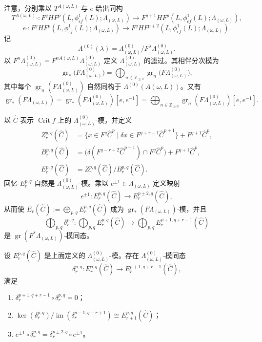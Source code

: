 注意，分别乘以 $T^{A(\omega,L)}$ 与 $e$ 给出同构
\[
 T^{A(\omega,L)}\cdot:F^qHF^p(L,\phi_{\epsilon f}^1(L);\Lambda_{(\omega,L)})
 \longrightarrow F^{q+1}HF^p(L,\phi_{\epsilon f}^1(L);\Lambda_{(\omega,L)}),
\]
\[
 e\cdot:F^qHF^p(L,\phi_{\epsilon f}^1(L);\Lambda_{(\omega,L)})
 \longrightarrow F^qHF^{p+2}(L,\phi_{\epsilon f}^1(L);\Lambda_{(\omega,L)}).
\]
记
\[
 \Lambda^{(0)}(\lambda)=\Lambda_{(\omega,L)}^{(0)}
 /F^\lambda\Lambda_{(\omega,L)}^{(0)}.
\]
以
$F^n\Lambda_{(\omega,L)}^{(0)}=F^{nA(\omega,L)}\Lambda_{(\omega,L)}^{(0)}$
定义 $\Lambda_{(\omega,L)}^{(0)}$ 的滤过。其相伴分次模为
\[
 \operatorname{gr}_*\bigl(F\Lambda_{(\omega,L)}^{(0)}\bigr)
 =\bigoplus_{n\in\mathbb Z_{\geq0}}
 \operatorname{gr}_n\bigl(F\Lambda_{(\omega,L)}^{(0)}\bigr),
\]
其中每个 $\operatorname{gr}_n(F\Lambda_{(\omega,L)}^{(0)})$ 自然同构于
$\Lambda^{(0)}(A(\omega,L))$。又有
\[
 \operatorname{gr}_*(F\Lambda_{(\omega,L)})
 =\operatorname{gr}_*(F\Lambda_{(\omega,L)}^{(0)})[e,e^{-1}]
 =\bigoplus_{n\in\mathbb Z_{\geq0}}
 \operatorname{gr}_n(F\Lambda_{(\omega,L)}^{(0)})[e,e^{-1}].
\]

以 $\widehat C$ 表示 $\operatorname{Crit}f$ 上的
$\Lambda_{(\omega,L)}^{(0)}$-模，并定义
\[
 \begin{aligned}
 Z_r^{p,q}(\widehat C)
 &=\{x\in F^q\widehat C^p\mid
 \delta x\in F^{q+r-1}\widehat C^{p+1}\}+F^{q+1}\widehat C^p,\\
 B_r^{p,q}(\widehat C)
 &=\bigl(\delta(F^{q-r+2}\widehat C^{p-1})\cap F^q\widehat C^p\bigr)
 +F^{q+1}\widehat C^p,\\
 E_r^{p,q}(\widehat C)&=Z_r^{p,q}(\widehat C)/B_r^{p,q}(\widehat C).
 \end{aligned}
\]
回忆 $E_r^{p,q}$ 自然是 $\Lambda_{(\omega,L)}^{(0)}$-模。乘以
$e^{\pm1}\in\Lambda_{(\omega,L)}$ 定义映射
\[
 e^{\pm1}:E_r^{p,q}(\widehat C)\to E_r^{p\pm2,q}(\widehat C),
\]
从而使
$E_r(\widehat C):=\bigoplus_{p,q}E_r^{p,q}(\widehat C)$ 成为
$\operatorname{gr}_*(F\Lambda_{(\omega,L)})$-模，并且
\[
 \bigoplus_{p,q}\delta_r^{p,q}:
 \bigoplus_{p,q}E_r^{p,q}(\widehat C)
 \longrightarrow
 \bigoplus_{p,q}E_r^{p+1,q+r-1}(\widehat C)
\]
是 $\operatorname{gr}(F^*\Lambda_{(\omega,L)})$-模同态。

\begin{lemma}
\label{lem:spectral-sequence-differential}
设 $E_r^{p,q}(\widehat C)$ 是上面定义的 $\Lambda_{(\omega,L)}^{(0)}$-模。存在
$\Lambda_{(\omega,L)}^{(0)}$-模同态
\[
 \delta_r^{p,q}:E_r^{p,q}(\widehat C)\to
 E_r^{p+1,q+r-1}(\widehat C),
\]
满足
\begin{enumerate}[label=(\roman*)]
\item $\delta_r^{p+1,q+r-1}\circ\delta_r^{p,q}=0$；
\item $\ker(\delta_r^{p,q})/\operatorname{im}(\delta_r^{p-1,q-r+1})
 \cong E_{r+1}^{p,q}(\widehat C)$；
\item $e^{\pm1}\circ\delta_r^{p,q}
 =\delta_r^{p\pm2,q}\circ e^{\pm1}$。
\end{enumerate}
\end{lemma}

